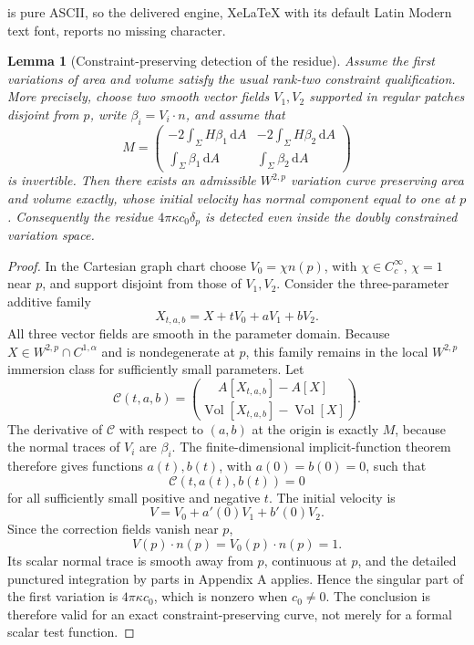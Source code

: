 \documentclass[10pt,a4paper]{amsart}
\newtheorem{lemma}[theorem]{Lemma}
\newcommand{\dd}{\,\mathrm d}
\begin{document}
is pure ASCII, so the delivered engine, XeLaTeX with its default Latin Modern text font, reports no missing character.
\begin{lemma}[Constraint-preserving detection of the residue]\label{lem:constraintbump}
Assume the first variations of area and volume satisfy the usual rank-two constraint qualification. More precisely, choose two smooth vector fields \(V_1,V_2\) supported in regular patches disjoint from \(p\), write \(\beta_i=V_i\cdot n\), and assume that
\begin{equation}
M=\begin{pmatrix}
-2\displaystyle\int_\Sigma H\beta_1\dd A&-2\displaystyle\int_\Sigma H\beta_2\dd A\\[2mm]
\displaystyle\int_\Sigma\beta_1\dd A&\displaystyle\int_\Sigma\beta_2\dd A
\end{pmatrix}
\label{eq:constraintmatrix}
\end{equation}
is invertible. Then there exists an admissible \(W^{2,p}\) variation curve preserving area and volume exactly, whose initial velocity has normal component equal to one at \(p\). Consequently the residue \(4\pi\kappa c_0\delta_p\) is detected even inside the doubly constrained variation space.
\end{lemma}

\begin{proof}
In the Cartesian graph chart choose \(V_0=\chi n(p)\), with \(\chi\in C_c^\infty\), \(\chi=1\) near \(p\), and support disjoint from those of \(V_1,V_2\). Consider the three-parameter additive family
\[
X_{t,a,b}=X+tV_0+aV_1+bV_2.
\]
All three vector fields are smooth in the parameter domain. Because \(X\in W^{2,p}\cap C^{1,\alpha}\) and is nondegenerate at \(p\), this family remains in the local \(W^{2,p}\) immersion class for sufficiently small parameters. Let
\[
\mathcal C(t,a,b)=\binom{A[X_{t,a,b}]-A[X]}{\operatorname{Vol}[X_{t,a,b}]-\operatorname{Vol}[X]}.
\]
The derivative of \(\mathcal C\) with respect to \((a,b)\) at the origin is exactly \(M\), because the normal traces of \(V_i\) are \(\beta_i\). The finite-dimensional implicit-function theorem therefore gives functions \(a(t),b(t)\), with \(a(0)=b(0)=0\), such that
\[
\mathcal C(t,a(t),b(t))=0
\]
for all sufficiently small positive and negative \(t\). The initial velocity is
\[
V=V_0+a'(0)V_1+b'(0)V_2.
\]
Since the correction fields vanish near \(p\),
\[
V(p)\cdot n(p)=V_0(p)\cdot n(p)=1.
\]
Its scalar normal trace is smooth away from \(p\), continuous at \(p\), and the detailed punctured integration by parts in Appendix A applies. Hence the singular part of the first variation is \(4\pi\kappa c_0\), which is nonzero when \(c_0\ne0\). The conclusion is therefore valid for an exact constraint-preserving curve, not merely for a formal scalar test function.
\end{proof}
\end{document}
